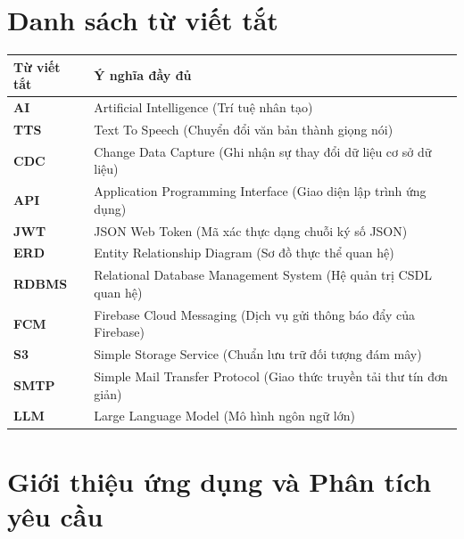 \documentclass[12pt,a4paper]{report}
\begin{document}
\newpage

\tableofcontents
\newpage
\listoftables
\newpage
\listoffigures
\newpage

\chapter*{Danh sách từ viết tắt}

\begin{table}[h!]
\centering
\begin{tabular}{p{3cm} p{11cm}}
\toprule
\textbf{Từ viết tắt} & \textbf{Ý nghĩa đầy đủ} \\
\midrule
\textbf{AI} & Artificial Intelligence (Trí tuệ nhân tạo) \\
\textbf{TTS} & Text To Speech (Chuyển đổi văn bản thành giọng nói) \\
\textbf{CDC} & Change Data Capture (Ghi nhận sự thay đổi dữ liệu cơ sở dữ liệu) \\
\textbf{API} & Application Programming Interface (Giao diện lập trình ứng dụng) \\
\textbf{JWT} & JSON Web Token (Mã xác thực dạng chuỗi ký số JSON) \\
\textbf{ERD} & Entity Relationship Diagram (Sơ đồ thực thể quan hệ) \\
\textbf{RDBMS} & Relational Database Management System (Hệ quản trị CSDL quan hệ) \\
\textbf{FCM} & Firebase Cloud Messaging (Dịch vụ gửi thông báo đẩy của Firebase) \\
\textbf{S3} & Simple Storage Service (Chuẩn lưu trữ đối tượng đám mây) \\
\textbf{SMTP} & Simple Mail Transfer Protocol (Giao thức truyền tải thư tín đơn giản) \\
\textbf{LLM} & Large Language Model (Mô hình ngôn ngữ lớn) \\
\bottomrule
\end{tabular}
\end{table}

\newpage

\chapter{Giới thiệu ứng dụng và Phân tích yêu cầu}
\end{document}
